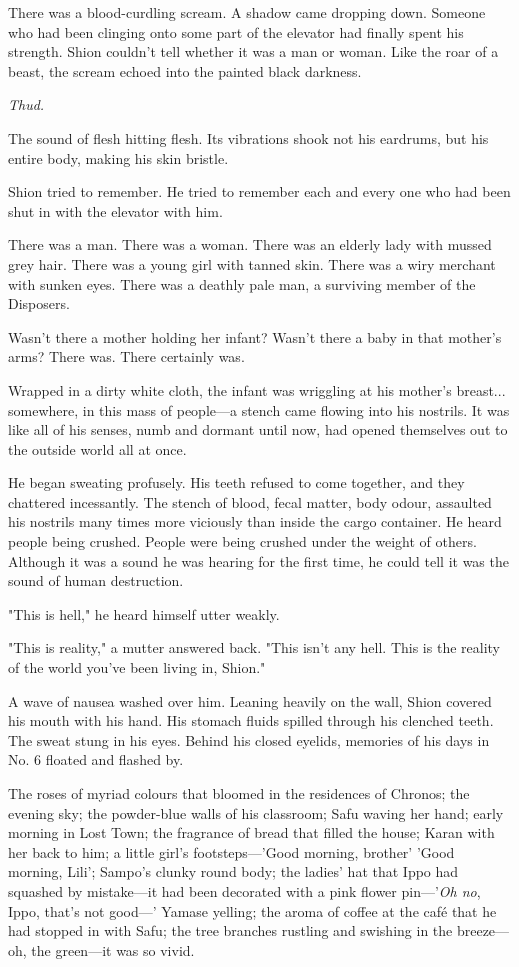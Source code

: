 There was a blood-curdling scream. A shadow came dropping down. Someone
who had been clinging onto some part of the elevator had finally spent
his strength. Shion couldn't tell whether it was a man or woman. Like
the roar of a beast, the scream echoed into the painted black darkness.

\emph{Thud.}

The sound of flesh hitting flesh. Its vibrations shook not his eardrums,
but his entire body, making his skin bristle.

Shion tried to remember. He tried to remember each and every one who had
been shut in with the elevator with him.

There was a man. There was a woman. There was an elderly lady with
mussed grey hair. There was a young girl with tanned skin. There was a
wiry merchant with sunken eyes. There was a deathly pale man, a
surviving member of the Disposers.

Wasn't there a mother holding her infant? Wasn't there a baby in that
mother's arms? There was. There certainly was.

Wrapped in a dirty white cloth, the infant was wriggling at his mother's
breast... somewhere, in this mass of people---a stench came flowing into
his nostrils. It was like all of his senses, numb and dormant until now,
had opened themselves out to the outside world all at once.

He began sweating profusely. His teeth refused to come together, and
they chattered incessantly. The stench of blood, fecal matter, body
odour, assaulted his nostrils many times more viciously than inside the
cargo container. He heard people being crushed. People were being
crushed under the weight of others. Although it was a sound he was
hearing for the first time, he could tell it was the sound of human
destruction.

"This is hell," he heard himself utter weakly.

"This is reality," a mutter answered back. "This isn't any hell. This is
the reality of the world you've been living in, Shion."

A wave of nausea washed over him. Leaning heavily on the wall, Shion
covered his mouth with his hand. His stomach fluids spilled through his
clenched teeth. The sweat stung in his eyes. Behind his closed eyelids,
memories of his days in No. 6 floated and flashed by.

The roses of myriad colours that bloomed in the residences of Chronos;
the evening sky; the powder-blue walls of his classroom; Safu waving her
hand; early morning in Lost Town; the fragrance of bread that filled the
house; Karan with her back to him; a little girl's footsteps---'Good
morning, brother' 'Good morning, Lili'; Sampo's clunky round body; the
ladies' hat that Ippo had squashed by mistake---it had been decorated with
a pink flower pin---'\emph{Oh no}, Ippo, that's not good---' Yamase yelling; the
aroma of coffee at the café that he had stopped in with Safu; the tree
branches rustling and swishing in the breeze---oh, the green---it was so
vivid.

